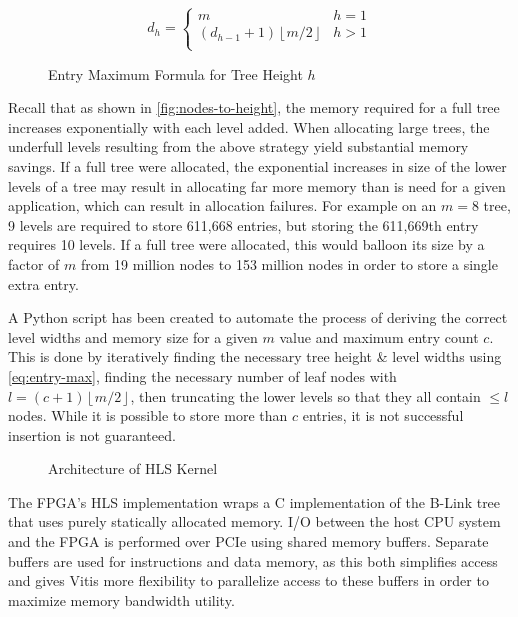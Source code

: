 \begin{figure}[h]
	\centering
	\ssp
	\begin{equation}
		d_h = \begin{cases}
			m & h = 1 \\
			(d_{h-1}+1)\left\lfloor{m/2}\right\rfloor & h > 1 \\
		\end{cases}
		\label{eq:entry-max}
	\end{equation}
	\caption*{Entry Maximum Formula for Tree Height $h$}
\end{figure}

Recall that as shown in \autoref{fig:nodes-to-height}, the memory required for a
full tree increases exponentially with each level added. When allocating large
trees, the underfull levels resulting from the above strategy yield substantial
memory savings. If a full tree were allocated, the exponential increases in size
of the lower levels of a tree may result in allocating far more memory than is
need for a given application, which can result in allocation failures.
%
For example on an $m=8$ tree, 9 levels are required to store 611,668 entries,
but storing the 611,669th entry requires 10 levels. If a full tree were
allocated, this would balloon its size by a factor of $m$ from 19 million nodes
to 153 million nodes in order to store a single extra entry.

A Python script has been created to automate the process of deriving the correct
level widths and memory size for a given $m$ value and maximum entry count $c$.
%
This is done by iteratively finding the necessary tree height \& level widths
using \autoref{eq:entry-max}, finding the necessary number of leaf nodes with
$l=(c+1)\left\lfloor{m/2}\right\rfloor$, then truncating the lower levels so
that they all contain $\leq l$ nodes.
%
While it is possible to store more than $c$ entries, it is not successful
insertion is not guaranteed.


\label{subsec:fpga-implementation}

\begin{figure}[H]
	\centering
	
	\caption{Architecture of HLS Kernel}
	\label{fig:hls-arch}
\end{figure}

The FPGA's HLS implementation wraps a C implementation of the B-Link tree that
uses purely statically allocated memory. I/O between the host CPU system and the
FPGA is performed over PCIe using shared memory buffers. Separate buffers are
used for instructions and data memory, as this both simplifies access and gives
Vitis more flexibility to parallelize access to these buffers in order to
maximize memory bandwidth utility.

